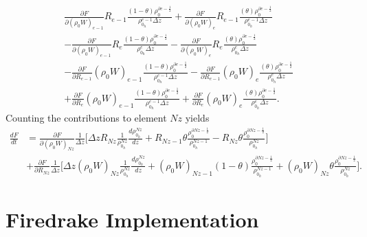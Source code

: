 \documentclass[a4paper,11pt]{article}
\begin{document}
\begin{equation}
\begin{aligned}
\frac{\partial F}{\partial (\rho_0 W)_{e-1}}R_{e-1}\frac{(1-\theta)\rho_0^{\partial e - \frac{1}{2}}}{\rho_{0{{}_h}}^{e-1}\Delta z}  + \frac{\partial F}{\partial (\rho_0 W)_{e}}R_{e-1} \frac{(\theta)\rho_0^{\partial e - \frac{1}{2}}}{\rho_{0{{}_h}}^{e-1}\Delta z}\\ - \frac{\partial F}{\partial (\rho_0 W)_{e-1}}R_{e}\frac{(1-\theta)\rho_0^{\partial e - \frac{1}{2}}}{\rho_{0{{}_h}}^{e}\Delta z}  -\frac{\partial F}{\partial (\rho_0 W)_{e}}R_{e} \frac{(\theta)\rho_0^{\partial e - \frac{1}{2}}}{\rho_{0{{}_h}}^{e}\Delta z}\\
-\frac{\partial F}{\partial R_{e-1}}(\rho_0 W)_{e-1}\frac{(1-\theta)\rho_0^{\partial e - \frac{1}{2}}}{\rho_{0{{}_h}}^{e-1}\Delta z}  -\frac{\partial F}{\partial R_{e-1}}(\rho_0 W)_{e} \frac{(\theta)\rho_0^{\partial e - \frac{1}{2}}}{\rho_{0{{}_h}}^{e}\Delta z} \\+\frac{\partial F}{\partial R_{e}}(\rho_0 W)_{e-1}\frac{(1-\theta)\rho_0^{\partial e - \frac{1}{2}}}{\rho_{0{{}_h}}^{e-1}\Delta z}  +\frac{\partial F}{\partial R_{e}}(\rho_0 W)_{e} \frac{(\theta)\rho_0^{\partial e - \frac{1}{2}}}{\rho_{0{{}_h}}^{e}\Delta z}.
\end{aligned}
\end{equation}
Counting the contributions to element $Nz$ yields
\begin{equation}
\begin{aligned}
\frac{d F}{d t}&=\frac{\partial F}{\partial (\rho_0 W)_{Nz}}\frac{1}{\Delta z}\bigg [    \Delta z R_{Nz} \frac{1}{\rho^{Nz}_{0{{}_h}}} \frac{d\rho^{Nz}_{0{{}_h}}}{dz}  + R_{Nz-1} \theta \frac{\rho_0^{\partial Nz - \frac{1}{2}}}{\rho_{0{{}_h}}^{Nz-1}} - R_{Nz} \theta\frac{\rho_0^{\partial Nz - \frac{1}{2}}}{\rho_{0{{}_h}}^{Nz}}       \bigg]\\
&+\frac{\partial F}{\partial R_{Nz}} \frac{1}{\Delta z}\bigg [    \Delta z (\rho_0 W)_{Nz} \frac{1}{\rho^{Nz}_{0{{}_h}}} \frac{d\rho^{Nz}_{0{{}_h}}}{dz} +   (\rho_0 W)_{Nz-1}(1-\theta)\frac{\rho_0^{\partial Nz - \frac{1}{2}}}{\rho_{0{{}_h}}^{Nz-1}}  + (\rho_0 W)_{Nz} \theta\frac{\rho_0^{\partial Nz - \frac{1}{2}}}{\rho_{0{{}_h}}^{Nz}}          \bigg].
\end{aligned}
\end{equation}




\section{Firedrake Implementation}
\end{document}
